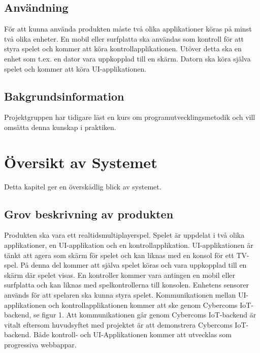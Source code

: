 \documentclass[10pt]{article}
\begin{document}
	\subsection{Användning}
		För att kunna använda produkten måste två olika applikationer köras på minst två olika enheter. En mobil eller surfplatta ska användas som kontroll för att styra spelet och kommer att köra kontrollapplikationen. Utöver detta ska en enhet som t.ex. en dator vara uppkopplad till en skärm. Datorn ska köra själva spelet och kommer att köra UI-applikationen.  
	
	\subsection{Bakgrundsinformation}
		Projektgruppen har tidigare läst en kurs om programutvecklingsmetodik och vill omsätta denna kunskap i praktiken. 
		
\pagebreak
\section{Översikt av Systemet}
	Detta kapitel ger en överskådlig blick av systemet.

	\subsection{Grov beskrivning av produkten}
	Produkten ska vara ett realtidsmultiplayerspel. Spelet är uppdelat i två olika applikationer, en UI-applikation och en kontrollapplikation. UI-applikationen är tänkt att agera som skärm för spelet och kan liknas med en konsol för ett TV-spel. På denna del kommer att själva spelet köras och vara uppkopplad till en skärm där spelet visas. En kontroller kommer vara antingen en mobil eller surfplatta och kan liknas med spelkontrollerna till konsolen. Enhetens sensorer används för att spelaren ska kunna styra spelet. Kommunikationen mellan UI-applikationen och kontrollapplikationen kommer att ske genom Cybercoms IoT-backend, se figur 1. Att kommunikationen går genom Cybercoms IoT-backend är vitalt eftersom huvudsyftet med projektet är att demonstrera Cybercoms IoT-backend.  Både kontroll- och UI-Applikationen kommer att utvecklas som progressiva webbappar. 
	
\end{document}
